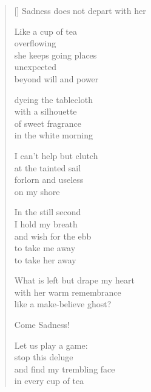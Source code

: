 \documentclass[11pt,a4paper]{article}
\begin{document}
\thispagestyle{empty}

\poemtitle{}

\settowidth{\versewidth}{This sadness does not die with you}

\bigskip

\begin{verse}[\versewidth]
Sadness does not depart with her

Like a cup of tea\\
overflowing\\
she keeps going places\\
unexpected\\
beyond will and power

dyeing the tablecloth\\
with a silhouette\\
of sweet fragrance\\
in the white morning

I can't help but clutch\\
at the tainted sail\\
forlorn and useless\\
on my shore

In the still second\\
I hold my breath\\
and wish for the ebb\\
to take me away\\
to take her away

What is left but drape my heart\\
with her warm remembrance\\
like a make-believe ghost?

Come Sadness!

Let us play a game:\\
stop this deluge\\
and find my trembling face\\
in every cup of tea
\end{verse}
\end{document}
